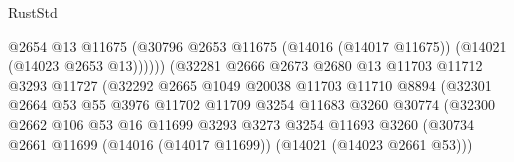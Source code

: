\begin{lexlean}{RustStd}
\begin{coremodule}
                                            @2654
                                            @13
                                            @11675
                                            (@30796
                                              @2653
                                              @11675
                                              (@14016 (@14017 @11675))
                                              (@14021 (@14023 @2653 @13))))))
                                      (@32281
                                        @2666
                                        @2673
                                        @2680
                                        @13
                                        @11703
                                        @11712
                                        @3293
                                        @11727
                                        (@32292
                                          @2665
                                          @1049
                                          @20038
                                          @11703
                                          @11710
                                          @8894
                                          (@32301
                                            @2664
                                            @53
                                            @55
                                            @3976
                                            @11702
                                            @11709
                                            @3254
                                            @11683
                                            @3260
                                            @30774
                                            (@32300
                                              @2662
                                              @106
                                              @53
                                              @16
                                              @11699
                                              @3293
                                              @3273
                                              @3254
                                              @11693
                                              @3260
                                              (@30734
                                                @2661
                                                @11699
                                                (@14016 (@14017 @11699))
                                                (@14021 (@14023 @2661 @53)))

\end{coremodule}
\end{lexlean}
